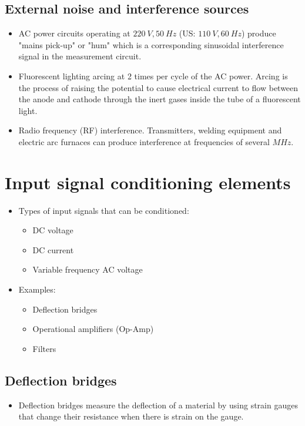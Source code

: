 \documentclass[11pt]{article}
\begin{document}
 \newpage

\subsection{External noise and interference sources}
\label{sec:orgd334230}
\begin{itemize}
\item AC power circuits operating at \(\qty{220}{V}, \qty{50}{Hz}\) (US: \(\qty{110}{V}, \qty{60}{Hz}\)) produce "mains pick-up" or "hum" which is a corresponding sinusoidal interference signal in the measurement circuit.
\item Fluorescent lighting arcing at 2 times per cycle of the AC power. Arcing is the process of raising the potential to cause electrical current to flow between the anode and cathode through the inert gases inside the tube of a fluorescent light.
\item Radio frequency (RF) interference. Transmitters, welding equipment and electric arc furnaces can produce interference at frequencies of several \(\unit{MHz}\).
\end{itemize}

\section{Input signal conditioning elements}
\label{sec:orge3d3342}
\begin{itemize}
\item Types of input signals that can be conditioned:
\begin{itemize}
\item DC voltage
\item DC current
\item Variable frequency AC voltage
\end{itemize}
\item Examples:
\begin{itemize}
\item Deflection bridges
\item Operational amplifiers (Op-Amp)
\item Filters
\end{itemize}
\end{itemize}

\subsection{Deflection bridges}
\label{sec:orgfa536ec}
\begin{itemize}
\item Deflection bridges measure the deflection of a material by using strain gauges that change their resistance when there is strain on the gauge.
\end{itemize}
\end{document}
